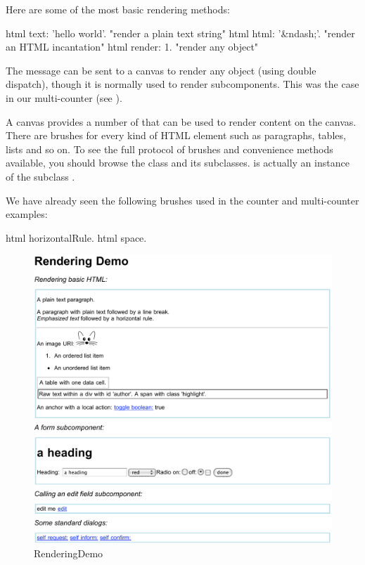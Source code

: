 \documentclass[a4paper,10pt,twoside]{book}
\begin{document}
Here are some of the most basic rendering methods:
\begin{code}{}
html text: 'hello world'.  "render a plain text string"
html html: '&ndash;'.     "render an HTML incantation"
html render: 1.              "render any object"
\end{code}

The message  can be sent to a canvas to render any object (using double dispatch), though it is normally used to render subcomponents.
This was the case in our multi-counter (see ).

A canvas provides a number of  that can be used to render content on the canvas.
There are brushes for every kind of HTML element such as paragraphs, tables, lists and so on.
To see the full protocol of brushes and convenience methods available, you should browse the class  and its subclasses.
 is actually an instance of the subclass .

We have already seen the following brushes used in the counter and multi-counter examples:
\begin{code}{}
html horizontalRule.
html space.
\end{code}

\begin{figure}[ht]
\begin{center}
\includegraphics[width=\textwidth]{RenderingDemo}
\caption{RenderingDemo}
\label{fig:RenderingDemo}
\end{center}
\end{figure}
\end{document}
